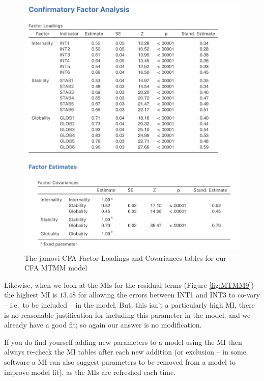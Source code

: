 \documentclass[
]{book}
\begin{document}
\begin{figure}

{\centering \includegraphics[width=1\linewidth]{img/factoranalysis/MTMM7} 

}

\caption{The jamovi CFA Factor Loadings and Covariances tables for our CFA MTMM model}\label{fig:MTMM7}
\end{figure}

Likewise, when we look at the MIs for the residual terms (Figure \ref{fig:MTMM9}) the highest MI is \(13.48\) for allowing the errors between INT1 and INT3 to co-vary -- i.e.~to be included -- in the model. But, this isn't a particularly high MI, there is no reasonable justification for including this parameter in the model, and we already have a good fit; so again our answer is no modification.

If you do find yourself adding new parameters to a model using the MI then always re-check the MI tables after each new addition (or exclusion -- in some software a MI can also suggest parameters to be removed from a model to improve model fit), as the MIs are refreshed each time.
\end{document}
